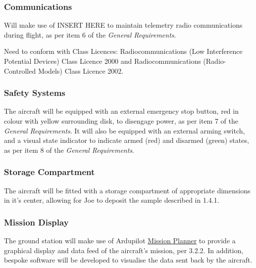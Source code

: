 \subsubsection*{Communications}
Will make use of INSERT HERE to maintain telemetry radio communications during flight, as per item 6 of the \textit{General Requirements}. 

Need to conform with Class Licences: Radiocommunications (Low Interference Potential Devices) Class Licence 2000 and Radiocommunications (Radio-Controlled Models) Class Licence 2002.

\subsubsection*{Safety Systems}
The aircraft will be equipped with an external emergency stop button, red in colour with yellow surrounding disk, to disengage power, as per item 7 of the \textit{General Requirements}. It will also be equipped with an external arming switch, and a visual state indicator to indicate armed (red) and disarmed (green) states, as per item 8 of the \textit{General Requirements}.

\subsubsection*{Storage Compartment}
The aircraft will be fitted with a storage compartment of appropriate dimensions in it's center, allowing for Joe to deposit the sample described in 1.4.1.

\subsubsection*{Mission Display}
The ground station will make use of Ardupilot \href{http://planner.ardupilot.com/}{Mission Planner} to provide a graphical display and data feed of the aircraft's mission, per 3.2.2. In addition, bespoke software will be developed to visualise the data sent back by the aircraft.
